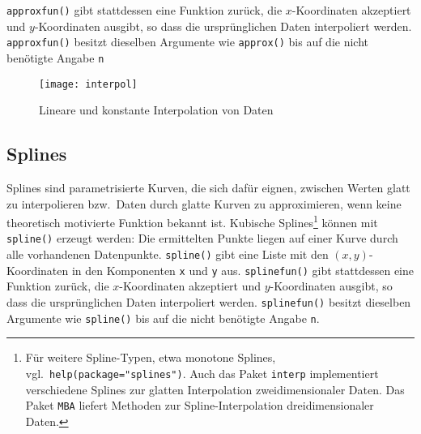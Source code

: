 \lstinline!approxfun()! gibt stattdessen eine Funktion zurück, die $x$-Koordinaten akzeptiert und $y$-Koordinaten ausgibt, so dass die ursprünglichen Daten interpoliert werden. \lstinline!approxfun()! besitzt dieselben Argumente wie \lstinline!approx()! bis auf die nicht benötigte Angabe \lstinline!n!

\begin{figure}[ht]
\centering
\texttt{[image: interpol]}
\vspace*{-1.5em}
\caption{Lineare und konstante Interpolation von Daten}
\label{fig:interpol}
\end{figure}

\subsection{Splines}
\label{sec:splines}

Splines sind parametrisierte Kurven, die sich dafür eignen, zwischen Werten glatt zu interpolieren bzw.\ Daten durch glatte Kurven zu approximieren, wenn keine theoretisch motivierte Funktion bekannt ist. Kubische Splines\footnote{Für weitere Spline-Typen, etwa monotone Splines, vgl.\ \lstinline!help(package="splines")!. Auch das Paket  \lstinline!interp! \cite{Gebhardt2024} implementiert verschiedene Splines zur glatten Interpolation zweidimensionaler Daten. Das Paket  \lstinline!MBA! \cite{Finley2024} liefert Methoden zur Spline-Interpolation dreidimensionaler Daten.} können mit \lstinline!spline()! erzeugt werden: Die ermittelten Punkte liegen auf einer Kurve durch alle vorhandenen Datenpunkte. \lstinline!spline()! gibt eine Liste mit den $(x, y)$-Koordinaten in den Komponenten \lstinline!x! und \lstinline!y! aus. \lstinline!splinefun()! gibt stattdessen eine Funktion zurück, die $x$-Koordinaten akzeptiert und $y$-Koordinaten ausgibt, so dass die ursprünglichen Daten interpoliert werden. \lstinline!splinefun()! besitzt dieselben Argumente wie \lstinline!spline()! bis auf die nicht benötigte Angabe \lstinline!n!.

